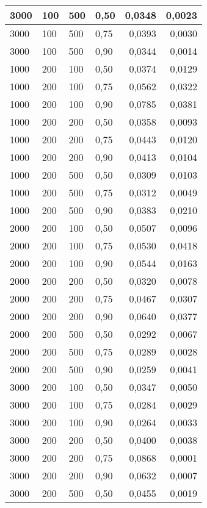 \documentclass[11pt,a4paper,oneside]{report}
\begin{document}
\begin{center}
\begin{longtable}{|l|l|l|l|r@{$\pm$}r|}
		3000 & 100 & 500 & 0,50 & 0,0348 & 0,0023\\ \hline
		3000 & 100 & 500 & 0,75 & 0,0393 & 0,0030\\ \hline
		3000 & 100 & 500 & 0,90 & 0,0344 & 0,0014\\ \hline
		1000 & 200 & 100 & 0,50 & 0,0374 & 0,0129\\ \hline
		1000 & 200 & 100 & 0,75 & 0,0562 & 0,0322\\ \hline
		1000 & 200 & 100 & 0,90 & 0,0785 & 0,0381\\ \hline
		1000 & 200 & 200 & 0,50 & 0,0358 & 0,0093\\ \hline
		1000 & 200 & 200 & 0,75 & 0,0443 & 0,0120\\ \hline
		1000 & 200 & 200 & 0,90 & 0,0413 & 0,0104\\ \hline
		1000 & 200 & 500 & 0,50 & 0,0309 & 0,0103\\ \hline
		1000 & 200 & 500 & 0,75 & 0,0312 & 0,0049\\ \hline
		1000 & 200 & 500 & 0,90 & 0,0383 & 0,0210\\ \hline
		2000 & 200 & 100 & 0,50 & 0,0507 & 0,0096\\ \hline
		2000 & 200 & 100 & 0,75 & 0,0530 & 0,0418\\ \hline
		2000 & 200 & 100 & 0,90 & 0,0544 & 0,0163\\ \hline
		2000 & 200 & 200 & 0,50 & 0,0320 & 0,0078\\ \hline
		2000 & 200 & 200 & 0,75 & 0,0467 & 0,0307\\ \hline
		2000 & 200 & 200 & 0,90 & 0,0640 & 0,0377\\ \hline
		2000 & 200 & 500 & 0,50 & 0,0292 & 0,0067\\ \hline
		2000 & 200 & 500 & 0,75 & 0,0289 & 0,0028\\ \hline
		2000 & 200 & 500 & 0,90 & 0,0259 & 0,0041\\ \hline
		3000 & 200 & 100 & 0,50 & 0,0347 & 0,0050\\ \hline
		3000 & 200 & 100 & 0,75 & 0,0284 & 0,0029\\ \hline
		3000 & 200 & 100 & 0,90 & 0,0264 & 0,0033\\ \hline
		3000 & 200 & 200 & 0,50 & 0,0400 & 0,0038\\ \hline
		3000 & 200 & 200 & 0,75 & 0,0868 & 0,0001\\ \hline
		3000 & 200 & 200 & 0,90 & 0,0632 & 0,0007\\ \hline
		3000 & 200 & 500 & 0,50 & 0,0455 & 0,0019\\ \hline

\end{longtable}
\end{center}
\end{document}
